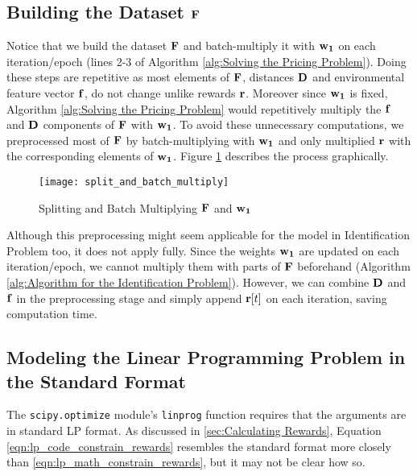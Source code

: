 \subsection{Building the Dataset $\mathbf{F}$}
Notice that we build the dataset $\mathbf{F}$ and batch-multiply it with $\mathbf{w_1}$ on each iteration/epoch (lines 2-3 of Algorithm \ref{alg:Solving the Pricing Problem}). Doing these steps are repetitive as most elements of $\mathbf{F}$, distances $\mathbf{D}$ and environmental feature vector $\mathbf{f}$, do not change unlike rewards $\mathbf{r}$. Moreover since $\mathbf{w_1}$ is fixed, Algorithm \ref{alg:Solving the Pricing Problem} would repetitively multiply the $\mathbf{f}$ and $\mathbf{D}$ components of $\mathbf{F}$ with $\mathbf{w_1}$. To avoid these unnecessary computations, we preprocessed most of $\mathbf{F}$ by batch-multiplying with $\mathbf{w_1}$ and only multiplied $\mathbf{r}$ with the corresponding elements of $\mathbf{w_1}$. Figure \ref{fig:Splitting and Batch Multiplying F and w1} describes the process graphically.\\
\begin{figure}[!htbp]
    \centering
    \texttt{[image: split\_and\_batch\_multiply]}
    \caption{Splitting and Batch Multiplying $\mathbf{F}$ and $\mathbf{w_1}$}
    \label{fig:Splitting and Batch Multiplying F and w1}
\end{figure}    
Although this preprocessing might seem applicable for the model in Identification Problem too, it does not apply fully. Since the weights $\mathbf{w_1}$ are updated on each iteration/epoch, we cannot multiply them with parts of $\mathbf{F}$ beforehand (Algorithm \ref{alg:Algorithm for the Identification Problem}). However, we can combine $\mathbf{D}$ and $\mathbf{f}$ in the preprocessing stage and simply append $\mathbf{r}[t]$ on each iteration, saving computation time.

\subsection{Modeling the Linear Programming Problem in the Standard Format}
The \texttt{scipy.optimize} module's \texttt{linprog} function requires that the arguments are in standard LP format. As discussed in \cref{sec:Calculating Rewards}, Equation \ref{eqn:lp_code_constrain_rewards} resembles the standard format more closely than \ref{eqn:lp_math_constrain_rewards}, but it may not be clear how so.\\

